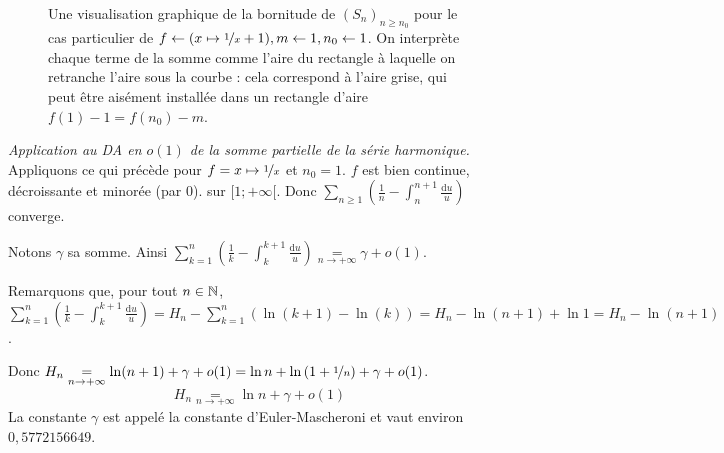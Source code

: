 \documentclass{article}
\renewenvironment{question_kholle}[2][ ]
{
	\subsection{\texorpdfstring{#2}{}}
	\notblank{#1}
	{
		\noindent #1
		\bigbreak
	}
	{}
	\begin{proof}
}
{
	\end{proof}
}
\begin{document}
\begin{question_kholle}
\begin{figure}[H]
		\caption{Une visualisation graphique de la bornitude de $(S_n)_{n \geqslant n_0}$ pour le cas particulier de $f \leftarrow (x \mapsto \nicefrac 1 x + 1), m \leftarrow 1, n_0 \leftarrow 1$. On interprète chaque terme de la somme comme l'aire du rectangle à laquelle on retranche l'aire sous la courbe : cela correspond à l'aire grise, qui peut être aisément installée dans un rectangle d'aire $f(1) - 1 = f(n_0) - m$.}
	\end{figure}

	\textit{Application au DA en $o(1)$ de la somme partielle de la série harmonique.}
	Appliquons ce qui précède pour $f = x \mapsto \nicefrac{1}{x}$ et $n_0 = 1$. $f$ est bien continue, décroissante et minorée (par 0). sur $[1; + \infty[$.
	Donc $\displaystyle \sum_{ n \geqslant 1} \left( \frac{1}{n} - \int_{n}^{n+1} \frac{\mathrm du}{u} \right)$ converge.

	Notons $\gamma$ sa somme. Ainsi $\displaystyle \sum_{k=1}^{n} \left( \frac{1}{k} - \int_{k}^{k+1} \frac{\mathrm du}{u} \right) \underset{n \to +\infty}{=} \gamma + o(1)$.

	Remarquons que, pour tout $n \in \mathbb N$,
	$\displaystyle \sum_{k=1}^{n} \left( \frac{1}{k} - \int_{k}^{k+1} \frac{\mathrm du}{u} \right)
		= H_n - \sum_{k=1}^{n} \left( \ln(k+1) - \ln(k) \right)
		= H_n - \ln(n+1) + \ln 1
		= H_n - \ln(n+1)$.

	Donc $H_n \underset{n \to +\infty}{=} \ln(n+1) + \gamma + o(1) = \ln n + \ln \left( 1 + \nicefrac{1}{n} \right) + \gamma + o(1)$.
	\begin{equation*}
		H_n \underset{n \to +\infty}{=} \ln n + \gamma + o(1)
	\end{equation*}
	La constante $\gamma$ est appelé la constante d'Euler-Mascheroni et vaut environ $0,5772156649$.
\end{question_kholle}
\end{document}
